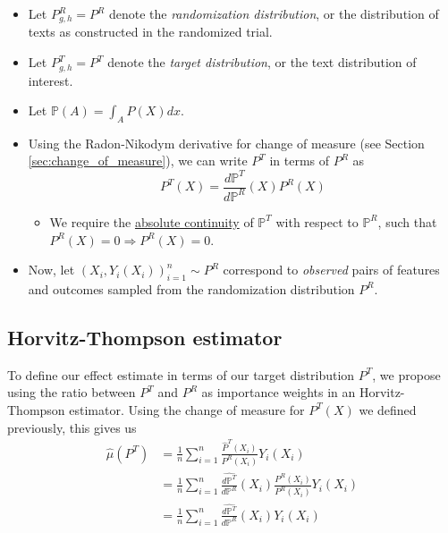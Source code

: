 \documentclass{article}
\newcommand{\vl}[1]{\textcolor{red}{[VL: #1]}}
\begin{document}
	\begin{itemize}
		\item Let $P^R_{g,h} = P^R$ denote the \textit{randomization distribution}, or the distribution of texts as constructed in the randomized trial.
		\item Let $P^T_{g,h} = P^T$ denote the \textit{target distribution}, or the text distribution of interest.
		\item Let $\mathbb{P}(A) = \int_A P(X) dx$.
		\item Using the Radon-Nikodym derivative for change of measure (see Section \ref{sec:change_of_measure}), we can write $P^T$ in terms of $P^R$ as
		\begin{equation*}
			P^T(X) = \frac{d\mathbb{P}^T}{d\mathbb{P}^R}(X)P^R(X)
		\end{equation*}
		\begin{itemize}
			\item We require the \href{https://en.wikipedia.org/wiki/Absolute_continuity#Absolute_continuity_of_measures}{absolute continuity} of $\mathbb{P}^T$ with respect to  $\mathbb{P}^R$, such that $P^R(X) = 0 \Rightarrow P^R(X) = 0$.
		\end{itemize}
		\item Now, let $(X_i,Y_i(X_i))_{i=1}^n \sim P^R$ correspond to \textit{observed} pairs of features and outcomes sampled from the randomization distribution $P^R$.
	\end{itemize}
	
	\subsection{Horvitz-Thompson estimator}
	
	To define our effect estimate in terms of our target distribution $P^T$, we propose using the ratio between $P^T$ and $P^R$ as importance weights in an Horvitz-Thompson estimator. Using the change of measure for $P^T(X)$ we defined previously, this gives us 
	\begin{align*}
		\hat{\mu}(P^T) &= \frac{1}{n} \sum_{i=1}^n \frac{\hat{P}^T(X_i)}{P^R(X_i)}Y_i(X_i) \\
		&= \frac{1}{n} \sum_{i=1}^n \frac{\hat{d \mathbb{P}^T}}{d \mathbb{P}^R}(X_i)\frac{P^R(X_i)}{P^R(X_i)} Y_i(X_i) \\
		&=\boxed{\frac{1}{n} \sum_{i=1}^n \frac{\hat{d \mathbb{P}^T}}{d \mathbb{P}^R}(X_i)Y_i(X_i)}
	\end{align*}
	
\end{document}
